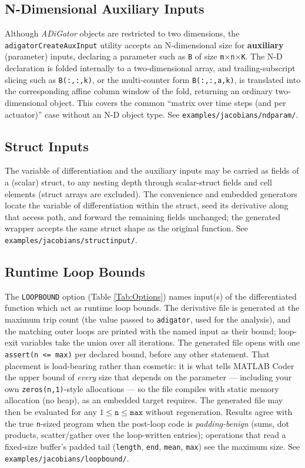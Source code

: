 \documentclass[10pt,pdftex]{article}
\begin{document}
\subsection{N-Dimensional Auxiliary Inputs}\label{SubSec:NDParam}
Although \emph{ADiGator} objects are restricted to two dimensions, the \texttt{adigatorCreateAuxInput} utility accepts an N-dimensional size for {\bf auxiliary} (parameter) inputs, declaring a parameter such as \texttt{B} of size \texttt{m}$\times$\texttt{n}$\times$\texttt{K}. The N-D declaration is folded internally to a two-dimensional array, and trailing-subscript slicing such as \texttt{B(:,:,k)}, or the multi-counter form \texttt{B(:,:,a,k)}, is translated into the corresponding affine column window of the fold, returning an ordinary two-dimensional object. This covers the common ``matrix over time steps (and per actuator)'' case without an N-D object type. See \texttt{examples/jacobians/ndparam/}.

\subsection{Struct Inputs}\label{SubSec:StructInput}
The variable of differentiation and the auxiliary inputs may be carried as fields of a (scalar) struct, to any nesting depth through scalar-struct fields and cell elements (struct arrays are excluded). The convenience and embedded generators locate the variable of differentiation within the struct, seed its derivative along that access path, and forward the remaining fields unchanged; the generated wrapper accepts the same struct shape as the original function. See \texttt{examples/jacobians/structinput/}.

\subsection{Runtime Loop Bounds}\label{SubSec:Loopbound}
The \texttt{LOOPBOUND} option (Table \ref{Tab:Options}) names input(s) of the differentiated function which act as runtime loop bounds. The derivative file is generated at the maximum trip count (the value passed to \texttt{adigator}, used for the analysis), and the matching outer loops are printed with the named input as their bound; loop-exit variables take the union over all iterations. The generated file opens with one \texttt{assert(n <= max)} per declared bound, before any other statement. That placement is load-bearing rather than cosmetic: it is what tells MATLAB Coder the upper bound of \emph{every} size that depends on the parameter --- including your own \texttt{zeros(n,1)}-style allocations --- so the file compiles with static memory allocation (no heap), as an embedded target requires. The generated file may then be evaluated for any $1 \le \texttt{n} \le \texttt{max}$ without regeneration. Results agree with the true \texttt{n}-sized program when the post-loop code is \emph{padding-benign} (sums, dot products, scatter/gather over the loop-written entries); operations that read a fixed-size buffer's padded tail (\texttt{length}, \texttt{end}, \texttt{mean}, \texttt{max}) see the maximum size. See \texttt{examples/jacobians/loopbound/}.
\end{document}
